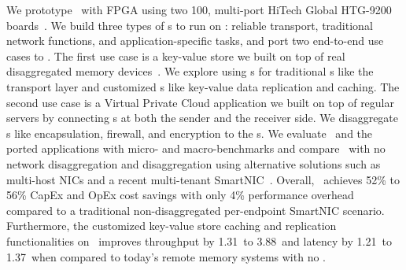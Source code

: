 We prototype \snic\ with FPGA using two 100\Gbps, multi-port HiTech Global HTG-9200 boards~\cite{htg9200}.
We build three types of \nt{}s to run on \snic:
reliable transport, traditional network functions, and application-specific tasks, and port two end-to-end use cases to \snic.
The first use case is a key-value store we built on top of real disaggregated memory devices~\cite{Clio}.
We explore using \snic{}s for traditional \nt{}s like the transport layer and customized \nt{}s like key-value data replication and caching.
The second use case is a Virtual Private Cloud application we built on top of regular servers by connecting \snic{}s at both the sender and the receiver side.
We disaggregate \nt{}s like encapsulation, firewall, and encryption to the \snic{}s.
We evaluate \snic\ and the ported applications with micro- and macro-benchmarks and compare \snic\ with no network disaggregation and disaggregation using alternative solutions such as multi-host NICs and a recent multi-tenant SmartNIC~\cite{panic-osdi20}.
Overall, \snic\ achieves 52\% to 56\% CapEx and OpEx cost savings with only 4\% performance overhead compared to a traditional non-disaggregated per-endpoint SmartNIC scenario.
Furthermore, the customized key-value store caching and replication functionalities on \snic\ improves throughput by 1.31\x\ to 3.88\x\ and latency by 1.21\x\ to 1.37\x\ when compared to today's remote memory systems with no \snic.
